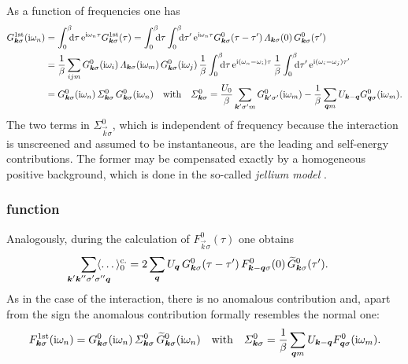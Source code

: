 As a function of  frequencies one has
%
\begin{align*}
    G \super{1st}_{\vec k \sigma}(\I \omega_n) &=
    \int \from 0 \till \beta \D \tau \, \E^{\I \omega_n \tau}
    G \super{1st}_{\vec k \sigma}(\tau) =
    \int \from 0 \till \beta \D \tau
    \int \from 0 \till \beta \D \tau' \,
    \E^{\I \omega_n \tau}
    G^0_{\vec k \sigma}(\tau - \tau') \,
    \Lambda_{\vec k \sigma}(0) \,
    G^0_{\vec k \sigma}(\tau')
    \\
    &= \frac 1 \beta \sum_{i j m}
    G^0_{\vec k \sigma}(\I \omega_i) \,
    \Lambda_{\vec k \sigma}(\I \omega_m) \,
    G^0_{\vec k \sigma}(\I \omega_j) \,
    \frac 1 \beta \int \from 0 \till \beta \D \tau \,
    \E^{\I (\omega_n - \omega_i) \tau} \,
    \frac 1 \beta \int \from 0 \till \beta \D \tau' \,
    \E^{\I (\omega_i - \omega_j) \tau'}
    \\
    &= G^0_{\vec k \sigma}(\I \omega_n) \,
    \Sigma^0_{\vec k \sigma} \,
    G^0_{\vec k \sigma}(\I \omega_n)
    \quad \text{with} \quad
    \Sigma^0_{\vec k \sigma}
    = \frac {U_0} \beta \sum_{\vec k' \sigma' m}
    G^0_{\vec k' \sigma'}(\I \omega_m)
    - \frac 1 \beta \sum_{\vec q m} U_{\vec k - \vec q}
    G^0_{\vec q \sigma}(\I \omega_m).
\end{align*}
%
The two terms in $\Sigma^0_{\vec k \sigma}$, which is independent of frequency
because the  interaction is unscreened and assumed to be
instantaneous, are the leading  and  self-energy
contributions. The former may be compensated exactly by a homogeneous positive
background, which is done in the so-called \emph{jellium model}
\cite[182]{Czycholl08}.

\subsubsection{ function}

Analogously, during the calculation of $F^0_{\vec k \sigma}(\tau)$ one obtains
%
\begin{align*}
    \sum_{\mathclap{\vec k' \vec k'' \sigma' \sigma'' \vec q}}
    \av \dots_0 \super{c.}
    = 2 \sum_{\vec q} U_{\vec q} \,
    G^0_{\vec k \sigma}(\tau - \tau') \,
    F^0_{\vec k - \vec q \sigma}(0) \,
    \widetilde G^0_{\vec k \sigma}(\tau').
\end{align*}
%
As in the case of the  interaction, there is no anomalous
 contribution and, apart from the sign the anomalous 
contribution formally resembles the normal one:
%
\begin{equation*}
    F \sp{\text{1st}}_{\boldsymbol k \sigma}(\mathrm i \omega_n)
    = G^0_{\boldsymbol k \sigma}(\mathrm i \omega_n) \,
    \varSigma^0_{\boldsymbol k \sigma} \,
    \widetilde G^0_{\boldsymbol k \sigma}(\mathrm i \omega_n)
    \quad \text{with} \quad
    \varSigma^0_{\boldsymbol k \sigma}
    = \frac 1 \beta \sum_{\boldsymbol q m} U_{\boldsymbol k - \boldsymbol q}
    F^0_{\boldsymbol q \sigma}(\mathrm i \omega_m).
\end{equation*}

